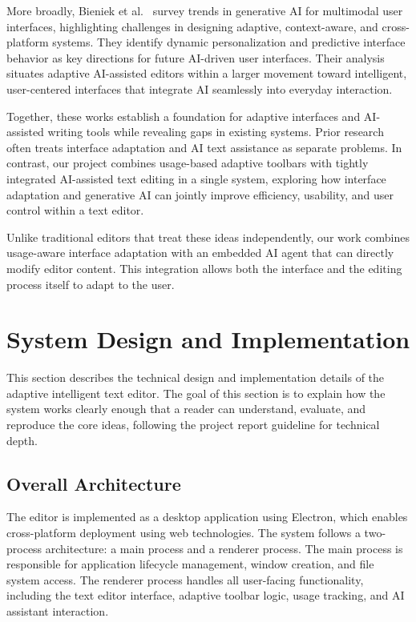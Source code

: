 \documentclass[sigconf]{acmart}
\begin{document}
More broadly, Bieniek et al.~\cite{Bieniek2024_GenAI_UX} survey trends in generative AI for multimodal user interfaces, highlighting challenges in designing adaptive, context-aware, and cross-platform systems. They identify dynamic personalization and predictive interface behavior as key directions for future AI-driven user interfaces. Their analysis situates adaptive AI-assisted editors within a larger movement toward intelligent, user-centered interfaces that integrate AI seamlessly into everyday interaction.

Together, these works establish a foundation for adaptive interfaces and AI-assisted writing tools while revealing gaps in existing systems. Prior research often treats interface adaptation and AI text assistance as separate problems. In contrast, our project combines usage-based adaptive toolbars with tightly integrated AI-assisted text editing in a single system, exploring how interface adaptation and generative AI can jointly improve efficiency, usability, and user control within a text editor.

Unlike traditional editors that treat these ideas independently, our work combines usage-aware interface adaptation with an embedded AI agent that can directly modify editor content. This integration allows both the interface and the editing process itself to adapt to the user.

\section{System Design and Implementation}
This section describes the technical design and implementation details of the adaptive intelligent text editor. The goal of this section is to explain how the system works clearly enough that a reader can understand, evaluate, and reproduce the core ideas, following the project report guideline for technical depth.

\subsection{Overall Architecture}
The editor is implemented as a desktop application using Electron, which enables cross-platform deployment using web technologies. The system follows a two-process architecture: a main process and a renderer process. The main process is responsible for application lifecycle management, window creation, and file system access. The renderer process handles all user-facing functionality, including the text editor interface, adaptive toolbar logic, usage tracking, and AI assistant interaction.
\end{document}
